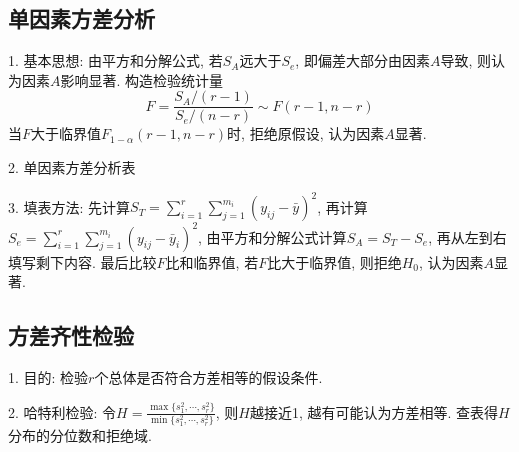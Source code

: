 \subsection{单因素方差分析}

1. 基本思想: 由平方和分解公式, 若$S_A$远大于$S_e$, 即偏差大部分由因素$A$导致, 则认为因素$A$影响显著. 构造检验统计量
\begin{equation*}
    F=\frac{S_A/(r-1)}{S_e/(n-r)} \sim F(r-1,n-r)
\end{equation*}
当$F$大于临界值$F_{1-\alpha}(r-1,n-r)$时, 拒绝原假设, 认为因素$A$显著.

2. 单因素方差分析表
\begin{table}[H]
\end{table}

3. 填表方法: 先计算$S_T=\sum\limits_{i=1}^r\sum\limits_{j=1}^{m_i} (y_{ij}-\bar{y})^2$, 再计算$S_e=\sum\limits_{i=1}^r\sum\limits_{j=1}^{m_i}(y_{ij}-\bar{y}_i)^2$, 由平方和分解公式计算$S_A=S_T-S_e$, 再从左到右填写剩下内容. 最后比较$F$比和临界值, 若$F$比大于临界值, 则拒绝$H_0$, 认为因素$A$显著.

\subsection{方差齐性检验}

1. 目的: 检验$r$个总体是否符合方差相等的假设条件.

2. 哈特利检验: 令$H=\frac{\max\{s_1^2,\cdots,s_r^2\}}{\min\{s_1^2,\cdots,s_r^2\}}$, 则$H$越接近1, 越有可能认为方差相等. 查表得$H$分布的分位数和拒绝域.

